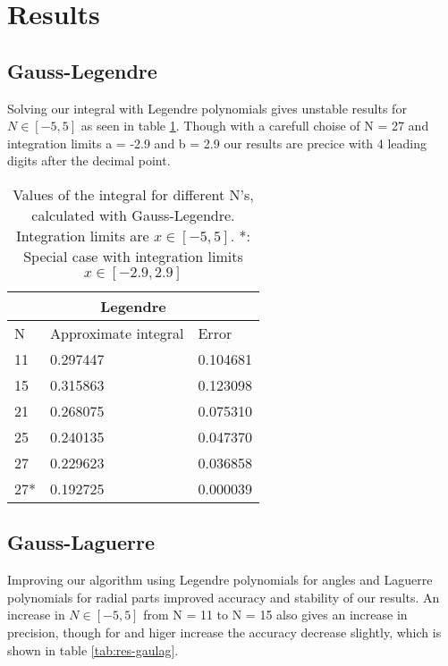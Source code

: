 \documentclass[../main.tex]{subfiles}
\begin{document}
\section{Results} \label{sec:results}
\subsection{Gauss-Legendre} \label{sec:QMProbresults}

Solving our integral with Legendre polynomials gives unstable results for $N \in [-5,5]$ as seen in table \ref{tab:res-gauleg}. Though with a carefull choise of N = 27 and integration limits a = -2.9 and b = 2.9 our results are precice with 4 leading digits after the decimal point.

\begin{table}[h!]
\begin{center}
  \begin{tabular}{ |p{1cm}|p{4cm}|p{3cm}|}
 \hline
 \multicolumn{3}{|c|}{\textbf{Legendre}} \\
 \hline
       N   &Approximate integral & Error\\
 \hline
 11 & 0.297447 & 0.104681\\
 15 & 0.315863 & 0.123098\\
 21 & 0.268075 & 0.075310\\
 25 & 0.240135 & 0.047370\\
 27 & 0.229623 & 0.036858\\
 27*& 0.192725 & 0.000039\\
 \hline
 \end{tabular}
 \caption{Values of the integral for different N's, calculated with Gauss-Legendre. Integration limits are $x\in[-5,5]$. *: Special case with integration limits $x\in[-2.9,2.9]$}
 \label{tab:res-gauleg}
 \end{center}
\end{table}

\subsection{Gauss-Laguerre} \label{sec:QMProbresults}
Improving our algorithm using Legendre polynomials for angles and Laguerre polynomials for radial parts improved accuracy and stability of our results. An increase in $N \in [-5,5]$ from N = 11 to N = 15 also gives an increase in precision, though for and higer increase the accuracy decrease slightly, which is shown in table \ref{tab:res-gaulag}.
\end{document}
